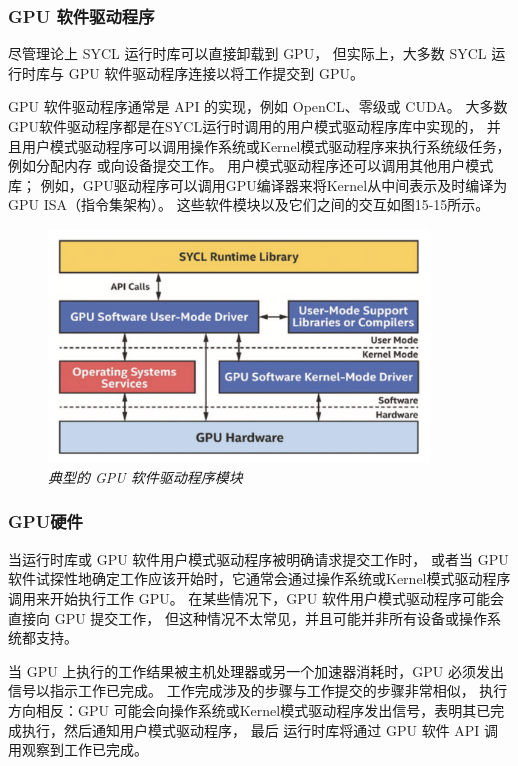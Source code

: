 \subsubsection{GPU 软件驱动程序}
尽管理论上 SYCL 运行时库可以直接卸载到 GPU，
但实际上，大多数 SYCL 运行时库与 GPU 软件驱动程序连接以将工作提交到 GPU。

GPU 软件驱动程序通常是 API 的实现，例如 OpenCL、零级或 CUDA。 
大多数GPU软件驱动程序都是在SYCL运行时调用的用户模式驱动程序库中实现的，
并且用户模式驱动程序可以调用操作系统或Kernel模式驱动程序来执行系统级任务，例如分配内存 或向设备提交工作。 
用户模式驱动程序还可以调用其他用户模式库； 
例如，GPU驱动程序可以调用GPU编译器来将Kernel从中间表示及时编译为GPU ISA（指令集架构）。 
这些软件模块以及它们之间的交互如图15-15所示。

\begin{figure}[H]
	\centering
	\includegraphics[width=0.9\textwidth]{figs/F15.15.png}
	\caption{\textit{典型的 GPU 软件驱动程序模块}}
\end{figure}

\subsubsection{GPU硬件}
当运行时库或 GPU 软件用户模式驱动程序被明确请求提交工作时，
或者当 GPU 软件试探性地确定工作应该开始时，它通常会通过操作系统或Kernel模式驱动程序调用来开始执行工作 GPU。 
在某些情况下，GPU 软件用户模式驱动程序可能会直接向 GPU 提交工作，
但这种情况不太常见，并且可能并非所有设备或操作系统都支持。

当 GPU 上执行的工作结果被主机处理器或另一个加速器消耗时，GPU 必须发出信号以指示工作已完成。 
工作完成涉及的步骤与工作提交的步骤非常相似，
执行方向相反：GPU 可能会向操作系统或Kernel模式驱动程序发出信号，表明其已完成执行，然后通知用户模式驱动程序，
最后 运行时库将通过 GPU 软件 API 调用观察到工作已完成。


